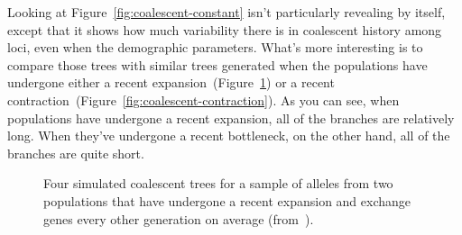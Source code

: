 Looking at Figure~\ref{fig:coalescent-constant} isn't particularly
revealing by itself, except that it shows how much variability there
is in coalescent history among loci, even when the demographic
parameters. What's more interesting is to compare those trees with
similar trees generated when the populations have undergone either a
recent expansion~(Figure~\ref{fig:coalescent-expansion}) or a recent
contraction~(Figure~\ref{fig:coalescent-contraction}). As you can see,
when populations have undergone a recent expansion, all of the
branches are relatively long. When they've undergone a recent
bottleneck, on the other hand, all of the branches are quite
short.

\begin{figure}
\begin{center}
\end{center}
\caption{Four simulated coalescent trees for a sample of alleles from
  two populations that have undergone a recent expansion and exchange
  genes every other generation on average
  (from~\cite{Harpending-etal-1998}).}\label{fig:coalescent-expansion} 
\end{figure}

